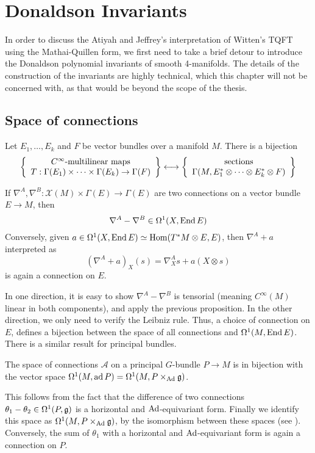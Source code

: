 
\chapter{Donaldson Invariants}
\label{chapter1}
In order to discuss the Atiyah and Jeffrey's interpretation of Witten's TQFT
using the Mathai-Quillen form, we first need to take a brief detour to introduce
the Donaldson polynomial invariants of smooth 4-manifolds. 
The details of the construction of the invariants are highly technical, which
this chapter will not be concerned with, as that would be beyond the scope of 
the thesis. 

\section{Space of connections}
\begin{prop}
	Let $E_1,\ldots,E_k$ and $F$ be vector bundles over a manifold  $M$. 
	There is a bijection
	\[
	\set{
		\begin{array}{c}
			C^\infty\text{-multilinear maps} \\
			T:\Gamma(E_1)\times \cdots \times \Gamma(E_k) \to \Gamma(F)
		\end{array}
	} \longleftrightarrow
	\set{
		\begin{array}{c}
			\text{sections}\\
			  \Gamma(M,E_1^*\otimes \cdots \otimes E_k^*\otimes F)
		
		\end{array}
	}
	\] 
\end{prop}
\begin{prop}
	If $\nabla^A,\nabla^B : \mathcal{X}(M) \times \Gamma(E) \to \Gamma(E)$ are
	two connections on a vector bundle $E\to M$, then 
	 \[
	\nabla^A - \nabla^B \in \Omega^1(X,\operatorname{End} E)
	\] 
	Conversely, given $a\in \Omega^1(X,\operatorname{End} E) \simeq \operatorname{Hom}(T^*M\otimes E,E)$, 
	then $\nabla^A+a$ interpreted as 
	\[
		(\nabla^A + a)_X(s) = \nabla^A_X s + a(X\otimes s)
	\] 
	is again a connection on  $E$. 
\end{prop}
In one direction, it is easy to show $\nabla^A-\nabla^B$ is tensorial (meaning
$C^\infty(M)$ linear in both components), and apply the previous proposition. In the other
direction, we only need to verify the Leibniz rule. Thus, a choice of connection
on $E$, defines a bijection between the space of all connections and
$\Omega^1(M,\operatorname{End} E)$. There is a similar result for principal bundles.

\begin{prop} \label{prop:connection_space}%
	The space of connections $\mathcal{A}$ on a principal $G$-bundle $P\to M$ is in bijection 
	with the vector space $\Omega^1(M,\operatorname{ad} P) = \Omega^1(M,P\times_{\operatorname{Ad}} \mathfrak{g})$.
\end{prop}
This follows from the fact that the difference of two connections
$\theta_1-\theta_2\in \Omega^1(P,\operatorname{\mathfrak{g}})$ is a horizontal and $\operatorname{Ad}$-equivariant form.
Finally we identify this space as $\Omega^1(M,P\times_{\operatorname{Ad}}\operatorname{\mathfrak{g}})$, by 
the isomorphism between these spaces (see \cite[Theorem 31.9]{loringtu}). 
Conversely, the sum of $\theta_1$ with 
a horizontal and $\operatorname{Ad}$-equivariant form is again a connection on  $P$.

